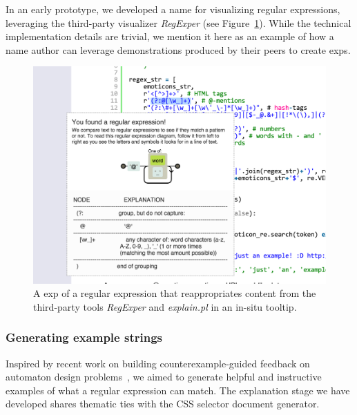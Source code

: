 In an early prototype, we developed a \Gls{name} for visualizing regular expressions, leveraging the third-party visualizer \emph{RegExper} (see Figure~\ref{fig:regex_visualization}).
While the technical implementation details are trivial, we mention it here as an example of how a \Gls{name} author can leverage demonstrations produced by their peers to create \glspl{exp}.

\begin{figure}
\centering
\includegraphics[width=\columnwidth]{figures/explain_on_select}
\caption{A \gls{exp} of a regular expression that reappropriates content from the third-party tools \emph{RegExper} and \emph{explain.pl} in an in-situ tooltip.}
\label{fig:regex_visualization}
\end{figure}

\subsubsection{Generating example strings}

Inspired by recent work on building counterexample-guided feedback on automaton design problems~\cite{dantoni_how_2015}, we aimed to generate helpful and instructive examples of what a regular expression can match.
The explanation stage we have developed shares thematic ties with the CSS selector document generator. 
\fi

